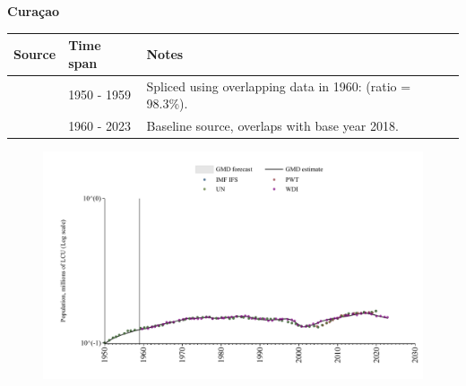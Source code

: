 \documentclass[12pt,a4paper,landscape]{article}
\begin{document}
\begin{adjustbox}{max totalsize={\paperwidth}{\paperheight},center}
\begin{minipage}[t][\textheight][t]{\textwidth}
\vspace*{0.5cm}
{}
\begin{center}
{\Large\bfseries Curaçao}
\end{center}
\vspace{0.5cm}
\begin{table}[H]
\centering
\small
\begin{tabular}{|l|l|l|}
\hline
\textbf{Source} & \textbf{Time span} & \textbf{Notes} \\
\hline
\rowcolor{white}\cite{IMF_IFS}& 1950 - 1959 &Spliced using overlapping data in 1960: (ratio = 98.3\%).\\
\rowcolor{lightgray}\cite{WDI}& 1960 - 2023 &Baseline source, overlaps with base year 2018.\\
\hline
\end{tabular}
\end{table}
\begin{figure}[H]
\centering
\includegraphics[width=\textwidth,height=0.6\textheight,keepaspectratio]{graphs/CUW_pop.pdf}
\end{figure}
\end{minipage}
\end{adjustbox}
\end{document}
